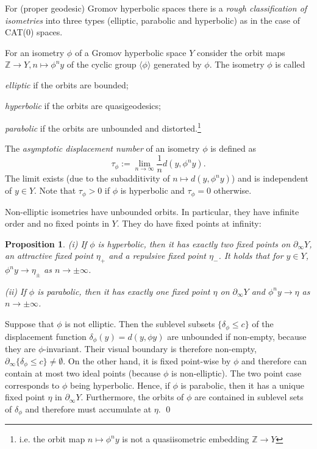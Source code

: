 \documentclass[12pt]{article}
\theoremstyle{boldplain}
\newtheorem{prop}[equation]{Proposition}
\theoremstyle{bolddefinition}
\numberwithin{equation}{section}
\def\Z{{\mathbb Z}}
\def\de{\delta}
\def\geo{\partial_{\infty}}
\def\<{\langle}
\def\>{\rangle}
\begin{document}
For (proper geodesic) Gromov hyperbolic spaces 
there is a {\em rough classification of isometries} into three types (elliptic, parabolic and hyperbolic) 
as in the case of CAT(0) spaces.

For an isometry $\phi$ of a Gromov hyperbolic space $Y$ consider the orbit maps $\Z\to Y,n\mapsto\phi^ny$ 
of the cyclic group $\<\phi\>$ generated by $\phi$. The isometry $\phi$ is called 

{\em elliptic} if the orbits are bounded;

{\em hyperbolic} if the orbits are quasigeodesics;

{\em parabolic} if the orbits are unbounded and distorted.\footnote{i.e. the orbit map $n\mapsto \phi^n y$ is not a quasiisometric embedding $\Z\to Y$}



The {\em asymptotic displacement number} 
of an isometry $\phi$
is defined as 
$$ \tau_{\phi}:= \lim_{n\to\infty} \frac{1}{n} d(y,\phi^n y).$$ 
The limit exists (due to the subadditivity of $n\mapsto d(y,\phi^n y)$) and is independent of $y\in Y$.
Note that $\tau_{\phi}>0$ if $\phi$ is hyperbolic and $\tau_{\phi}=0$ otherwise. 



Non-elliptic isometries have unbounded orbits.
In particular,
they have infinite order and no fixed points in $Y$.
They do have fixed points at infinity:

\begin{prop}
(i) If $\phi$ is hyperbolic,
then it has exactly two fixed points on $\geo Y$, an attractive fixed point $\eta_+$ and a repulsive fixed point $\eta_-$.
It holds that for $y\in Y$, $\phi^ny\to\eta_{\pm}$ as $n\to\pm\infty$. 

(ii) If $\phi$ is parabolic,
then it has exactly one fixed point $\eta$ on $\geo Y$
and $\phi^ny\to\eta$ as $n\to\pm\infty$. 
\end{prop}
\proof
Suppose that $\phi$ is not elliptic. 
Then the sublevel subsets $\{\de_{\phi}\leq c\}$ 
of the displacement function $\de_{\phi}(y)=d(y,\phi y)$ are unbounded if non-empty,
because they are $\phi$-invariant.
Their visual boundary is therefore non-empty, $\geo \{\de_{\phi}\leq c\}\neq\emptyset$. 
On the other hand, it is fixed point-wise by $\phi$  
and therefore can contain at most two ideal points
(because $\phi$ is non-elliptic). 
The two point case corresponds to $\phi$ being hyperbolic.
Hence, if $\phi$ is parabolic,
then it has a unique fixed point $\eta$ in $\geo Y$.
Furthermore, 
the orbits of $\phi$ are contained in sublevel sets of $\de_{\phi}$
and therefore must accumulate at $\eta$.
\qed
\end{document}
